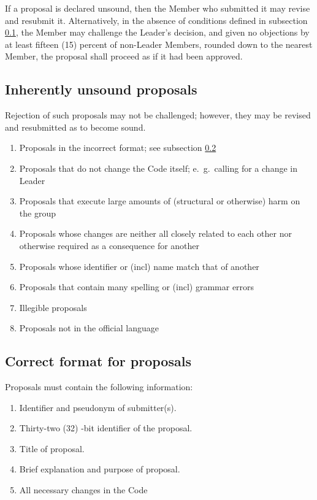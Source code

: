 \documentclass[10pt]{book}
\begin{document}
If a proposal is declared unsound, then the Member who submitted it may revise and resubmit it. Alternatively, in the absence of conditions defined in subsection \ref{subsec:unsound}, the Member may challenge the Leader's decision, and given no objections by at least fifteen (15) percent of non-Leader Members, rounded down to the nearest Member, the proposal shall proceed as if it had been approved.

\subsection{Inherently unsound proposals}
\label{subsec:unsound}

Rejection of such proposals may not be challenged; however, they may be revised and resubmitted as to become sound.

\begin{enumerate}
 \item Proposals in the incorrect format; see subsection \ref{subsec:propform}
 \item Proposals that do not change the Code itself; e.~g.~calling for a change in Leader
 \item Proposals that execute large amounts of (structural or otherwise) harm on the group
 \item Proposals whose changes are neither all closely related to each other nor otherwise required as a consequence for another
 \item Proposals whose identifier or (incl) name match that of another
 \item Proposals that contain many spelling or (incl) grammar errors
 \item Illegible proposals
 \item Proposals not in the official language
\end{enumerate}

\subsection{Correct format for proposals}
\label{subsec:propform}

Proposals must contain the following information:

\begin{enumerate}
 \item Identifier and pseudonym of submitter(s).
 \item Thirty-two (32) -bit identifier of the proposal.
 \item Title of proposal.
 \item Brief explanation and purpose of proposal.
 \item All necessary changes in the Code
\end{enumerate}
\end{document}
